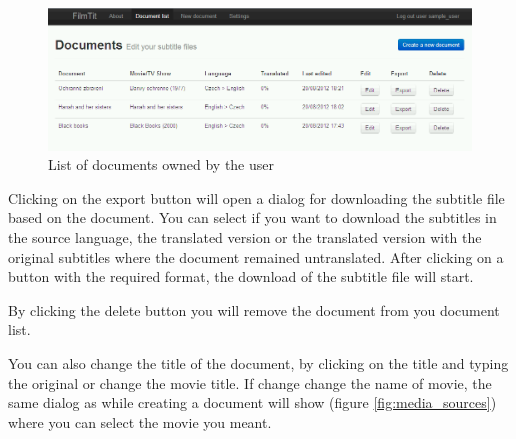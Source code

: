 \begin{figure}[h]
\begin{center}
\includegraphics[scale=0.4]{figures/user_manual/list_of_documents.png}
\end{center}
\caption{List of documents owned by the user}
\label{fig:document_list}
\end{figure}

Clicking on the export button will open a dialog for downloading the subtitle file based on the document. You can select if you want to download the subtitles in the source language, the translated version or the translated version with the original subtitles where the document remained untranslated. After clicking on a button with the required format, the download of the subtitle file will start.

By clicking the delete button you will remove the document from you document list.

You can also change the title of the document, by clicking on the title and typing the original or change the movie title. If change change the name of movie, the same dialog as while creating a document will show (figure \ref{fig:media_sources}) where you can select the movie you meant.